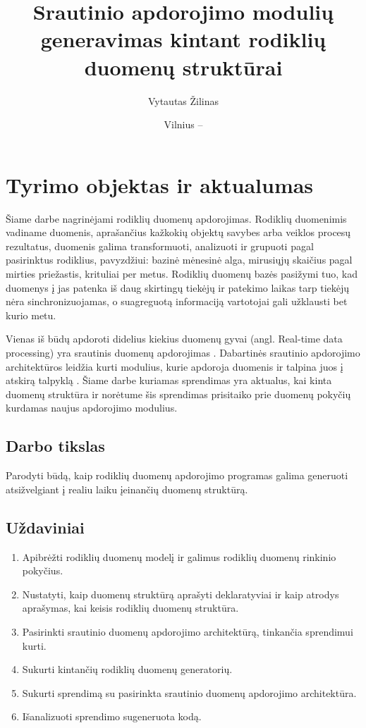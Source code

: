 \documentclass{VUMIFPSbakalaurinis}
\title{Srautinio apdorojimo modulių generavimas kintant rodiklių duomenų struktūrai}
\author{Vytautas Žilinas}
\date{Vilnius – \the\year}
\begin{document}
 
\maketitle

\cleardoublepage{}
\setcounter{page}{2}

\section{Tyrimo objektas ir aktualumas}
Šiame darbe nagrinėjami rodiklių duomenų apdorojimas. Rodiklių duomenimis vadiname duomenis, aprašančius kažkokių objektų savybes arba veiklos procesų rezultatus, 
duomenis galima transformuoti, analizuoti ir grupuoti pagal pasirinktus rodiklius, 
pavyzdžiui: bazinė mėnesinė alga, mirusiųjų skaičius pagal mirties priežastis, krituliai per metus. 
Rodiklių duomenų bazės pasižymi tuo, kad duomenys į jas patenka iš daug skirtingų tiekėjų ir patekimo laikas tarp tiekėjų nėra 
sinchronizuojamas, o suagreguotą informaciją vartotojai gali užklausti bet kurio metu.  \par
Vienas iš būdų apdoroti didelius kiekius duomenų gyvai (angl. Real-time data processing) yra srautinis duomenų apdorojimas \cite{BigData, StreamProcessingInData}. 
Dabartinės srautinio apdorojimo architektūros leidžia kurti modulius, kurie apdoroja duomenis ir talpina juos į atskirą talpyklą \cite{8Requirements}. 
Šiame darbe kuriamas sprendimas yra aktualus, kai kinta duomenų struktūra ir norėtume šis sprendimas prisitaiko 
prie duomenų pokyčių kurdamas naujus apdorojimo modulius.

\subsection{Darbo tikslas}
Parodyti būdą, kaip rodiklių duomenų apdorojimo programas galima generuoti atsižvelgiant į realiu laiku įeinančių duomenų struktūrą.

\subsection{Uždaviniai}
\begin{enumerate}
    \item Apibrėžti rodiklių duomenų modelį ir galimus rodiklių duomenų rinkinio pokyčius.
    \item Nustatyti, kaip duomenų struktūrą aprašyti deklaratyviai ir kaip atrodys aprašymas, kai keisis rodiklių duomenų struktūra.
    \item Pasirinkti srautinio duomenų apdorojimo architektūrą, tinkančia sprendimui kurti.
    \item Sukurti kintančių rodiklių duomenų generatorių.
    \item Sukurti sprendimą su pasirinkta srautinio duomenų apdorojimo architektūra.   
    \item Išanalizuoti sprendimo sugeneruota kodą.
\end{enumerate}
\end{document}
